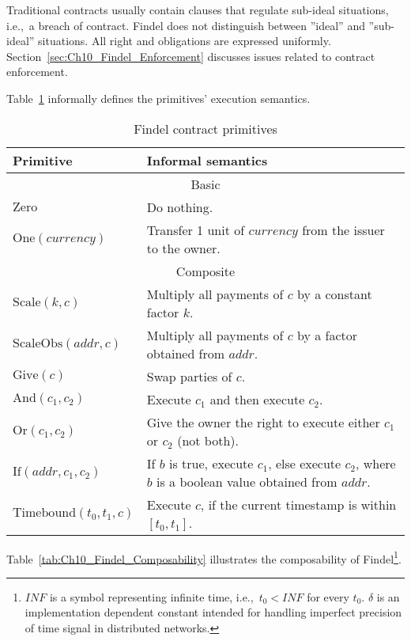 Traditional contracts usually contain clauses that regulate sub-ideal situations, i.e.,~a breach of contract.
Findel does not distinguish between ''ideal'' and ''sub-ideal'' situations.
All right and obligations are expressed uniformly.
Section~\ref{sec:Ch10_Findel_Enforcement} discusses issues related to contract enforcement.

Table~\ref{tab:Ch10_Findel_Semantics} informally defines the primitives' execution semantics.

\begin{table}[ht]
	\centering
	\begin{tabular}{|p{0.25\linewidth}|p{0.75\linewidth}|}
		\hline
		\textbf{Primitive} & \textbf{Informal semantics} \\
		\hline\hline
		\multicolumn{2}{|c|}{Basic}\\
		\hline
		\(\mathrm{Zero}\) & Do nothing. \\
		\hline
		\(\mathrm{One} (currency)\) & Transfer 1 unit of \(currency\) from the issuer to the owner. \\
		\hline\hline
		\multicolumn{2}{|c|}{Composite}\\
		\hline
		\(\mathrm{Scale} (k, c)\) & Multiply all payments of \(c\) by a constant factor \(k\). \\
		\hline
		\(\mathrm{ScaleObs} (addr, c)\) & Multiply all payments of \(c\) by a factor obtained from \(addr\). \\
		\hline
		\(\mathrm{Give} (c)\) & Swap parties of \(c\). \\
		\hline
		\(\mathrm{And} (c_1, c_2)\) & Execute \(c_1\) and then execute \(c_2\). \\
		\hline
		\(\mathrm{Or} (c_1, c_2)\) & Give the owner the right to execute either \(c_1\) or \(c_2\) (not both). \\
		\hline
		\(\mathrm{If} (addr, c_1, c_2)\) & If \(b\) is true, execute \(c_1\), else execute \(c_2\), where \(b\) is a boolean value obtained from \(addr\). \\
		\hline
		\(\mathrm{Timebound} (t_0, t_1, c)\) & Execute \(c\), if the current timestamp is within \([t_0, t_1]\). \\
		\hline
	\end{tabular}
	\caption{Findel contract primitives}
	\label{tab:Ch10_Findel_Semantics}
\end{table}

Table~\ref{tab:Ch10_Findel_Composability} illustrates the composability of Findel\footnote{$INF$ is a symbol representing infinite time, i.e.,~$t_0 < INF$ for every $t_0$. $\delta$ is an implementation dependent constant intended for handling imperfect precision of time signal in distributed networks.}.


